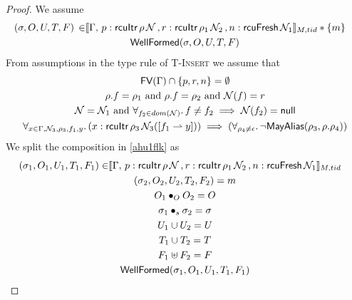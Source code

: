  \begin{proof}
 We assume
\begin{gather}\label{ahu1flk}
  \begin{aligned}
    (\sigma, O, U, T,F) \, \in &  \llbracket \Gamma,\,
 p:\textsf{rcuItr}\, \rho \, \mathcal{N} \, ,
  r:\textsf{rcuItr}\, \rho_1 \, \mathcal{N}_2 \, , n:\textsf{rcuFresh} \, \mathcal{N}_1 \rrbracket_{M,tid} * \{m\}
    \end{aligned} \\
\textsf{WellFormed}(\sigma,O,U,T,F)
\label{ahu2flk}
\end{gather}
From assumptions in the type rule of \textsc{T-Insert} we assume that
\begin{gather}
\textsf{FV}(\Gamma) \cap \{p,r,n\}  =\emptyset 
  \label{ahu3flk} \\
\rho.f  = \rho_1 \text{ and } \rho.f  = \rho_2 \text{ and } \mathcal{N}(f) = r
    \label{ahu4flk} \\
\mathcal{N} = \mathcal{N}_1 \text{ and } \forall_{f_2\in dom(\mathcal{N})} \ldotp f\neq f_2 \implies \mathcal{N}(f_2)=\textsf{null}
\label{ahu5flk} \\
\begin{aligned}
  \forall_{x \in \Gamma, \mathcal{N}_3, \rho_3,f_1,y} \ldotp (x:\textsf{rcuItr}\,\rho_3\,\mathcal{N}_3([f_1\rightharpoonup y])) \implies(\forall_{\rho_4\neq \epsilon} \ldotp \neg\mathsf{MayAlias}(\rho_3, \rho.\rho_4) )
\label{ahu6flk}
  \end{aligned}
\end{gather}
We split the composition in  \ref{ahu1flk} as 
\begin{gather} \label{ahu11flk}
  \begin{aligned}
    (\sigma_1, O_{1}, U_{1}, T_{1} ,F_1) \in & \llbracket \Gamma,\,
 p:\textsf{rcuItr}\, \rho \, \N \, ,
  r:\textsf{rcuItr}\, \rho_1 \, \N_2 \, , n:\textsf{rcuFresh} \, \N_1 \rrbracket_{M,tid} \end{aligned}\\
\label{ahu12flk}
(\sigma_2, O_{2}, U_{2}, T_{2},F_2) = m
\\
\label{ahu13flk}
O_{1} \bullet_{O} O_{2} = O
\\
\label{ahusigflk}
\sigma_1 \bullet_s \sigma_2 = \sigma \\
\label{ahu14flk}
U_{1} \cup U_{2} = U
\\
\label{ahu15flk}
T_{1} \cup T_{2} = T
\\
\label{ahuffflk}
F_1 \uplus F_2 = F
\\
\label{ahu16flk}
\textsf{WellFormed}(\sigma_1,O_{1},U_{1},T_{1},F_1)
\\
\label{ahu17flk}

\end{gather}
\end{proof}
